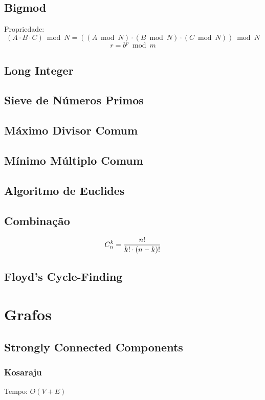 \documentclass[12pt,a4paper]{article}
\begin{document}
		\subsection{Bigmod}
			Propriedade:
			\[ (A \cdot B \cdot C) \bmod N = ((A \bmod N) \cdot (B \bmod N) \cdot (C \bmod N)) \bmod N \]
			\[ r = b^p \bmod m \]
			
		\subsection{Long Integer}
			
		\subsection{Sieve de Números Primos}
			
		\subsection{Máximo Divisor Comum}
			
		\subsection{Mínimo Múltiplo Comum}
			
		\subsection{Algoritmo de Euclides}
			
		\subsection{Combinação}
			\[ C_n^k = {n! \over {k! \cdot (n - k)!}} \]
			
		\subsection{Floyd's Cycle-Finding}
			

	\section{Grafos}
		\subsection{Strongly Connected Components}
			\subsubsection{Kosaraju}
				Tempo: \( O(V + E) \)
				
\end{document}
